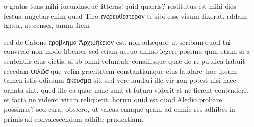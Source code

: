 


 o gratas tuas mihi iucundasque litteras! quid quaeris? restitutus est mihi dies festus. angebar enim quod Tiro ἐνερευθέστερον te sibi esse visum dixerat. addam igitur, ut censes, unum diem

 sed de Catone πρόβλημα Ἀρχιμήδειον est. non adsequor ut scribam quod tui convivae non modo libenter sed etiam aequo animo legere possint; quin etiam si a sententiis eius dictis, si ab omni voluntate consiliisque quae de re publica habuit recedam ψιλῶσ que velim gravitatem constantiamque eius laudare, hoc ipsum tamen istis odiosum ἄκουσμα sit. sed vere laudari ille vir non potest nisi haec ornata sint, quod ille ea quae nunc sunt et futura viderit et ne fierent contenderit et facta ne videret vitam reliquerit. horum quid est quod Aledio probare possimus? sed cura, obsecro, ut valeas eamque quam ad omnis res adhibes in primis ad convalescendum adhibe prudentiam.
